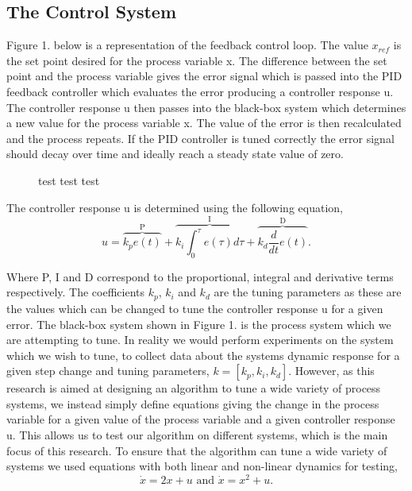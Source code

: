 \documentclass[conference]{IEEEtran}
\theoremstyle{definition}
\begin{document}
\subsection{The Control System}
\noindent Figure 1. below is a representation of the feedback control loop. The value $x_{ref}$ is the set point desired for the process variable x. The difference between the set point and the process variable gives the error signal which is passed into the PID feedback controller which evaluates the error producing a controller response u. The controller response u then passes into the black-box system which determines a new value for the process variable x. The value of the error is then recalculated and the process repeats. If the PID controller is tuned correctly the error signal should decay over time and ideally reach a steady state value of zero. 

\begin{figure}[htbp]
\caption{test test test }
\label{kpki}
\end{figure}

\noindent The controller response u is determined using the following equation,
\begin{equation}
    u = \overbrace{k_p e(t)}^\text{P} + \overbrace{k_i \int_{0}^{\tau}e(\tau)d\tau}^\text{I} + \overbrace{k_d \frac{d}{dt}e(t)}^\text{D}.
\end{equation}

\noindent Where P, I and D correspond to the proportional, integral and derivative terms respectively. The coefficients $k_p$, $k_i$ and $k_d$ are the tuning parameters as these are the values which can be changed to tune the controller response u for a given error. The black-box system shown in Figure 1. is the process system which we are attempting to tune. In reality we would perform experiments on the system which we wish to tune, to collect data about the systems dynamic response for a given step change and tuning parameters, $k=[k_p,k_i,k_d]$. However, as this research is aimed at designing an algorithm to tune a wide variety of process systems, we instead simply define equations giving the change in the process variable for a given value of the process variable and a given controller response u. This allows us to test our algorithm on different systems, which is the main focus of this research. To ensure that the algorithm can tune a wide variety of systems we used equations with both linear and non-linear dynamics for testing,
\begin{equation}
    \dot{x} = 2x + u \textrm{ and } \dot{x} = x^2 + u.
\end{equation}
\end{document}

